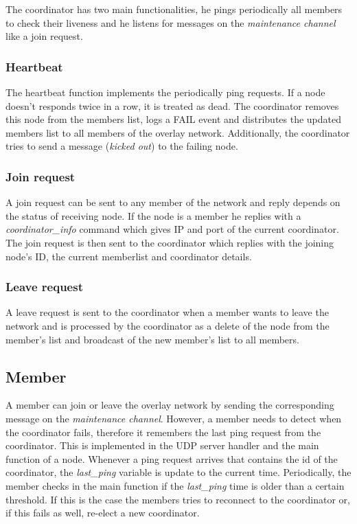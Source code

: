 \documentclass[paper=a4, fontsize=11pt]{scrartcl} %
\numberwithin{equation}{section} %
\numberwithin{figure}{section} %
\numberwithin{table}{section} %
\begin{document}
The coordinator has two main functionalities, he pings periodically all members to check their liveness and he listens for messages on the \textit{maintenance channel} like a join request. 

\subsubsection{Heartbeat}
The heartbeat function implements the periodically ping requests.
If a node doesn't responds twice in a row, it is treated as dead. The coordinator removes this node from the members list, logs a FAIL event and distributes the updated members list to all members of the overlay network. Additionally, the coordinator tries to send a message (\textit{kicked out}) to the failing node.

\subsubsection{Join request}
A join request can be sent to any member of the network and reply depends on the status of receiving node. If the node is a member he replies with a \textit{coordinator\_info} command which gives IP and port of the current coordinator. The join request is then sent to the coordinator which replies with the joining node's ID, the current memberlist and coordinator details.

\subsubsection{Leave request}
A leave request is sent to the coordinator when a member wants to leave the network and is processed by the coordinator as a delete of the node from the member's list and broadcast of the new member's list to all members.


\subsection{Member}

A member can join or leave the overlay network by sending the corresponding message on the \textit{maintenance channel}. However, a member needs to detect when the coordinator fails, therefore it remembers the last ping request from the coordinator. This is implemented in the UDP server handler and the main function of a node. Whenever a ping request arrives that contains the id of the coordinator, the \textit{last\_ping} variable is update to the current time. Periodically, the member checks in the main function if the \textit{last\_ping} time is older than a certain threshold. If this is the case the members tries to reconnect to the coordinator or, if this fails as well, re-elect a new coordinator. 
\end{document}
